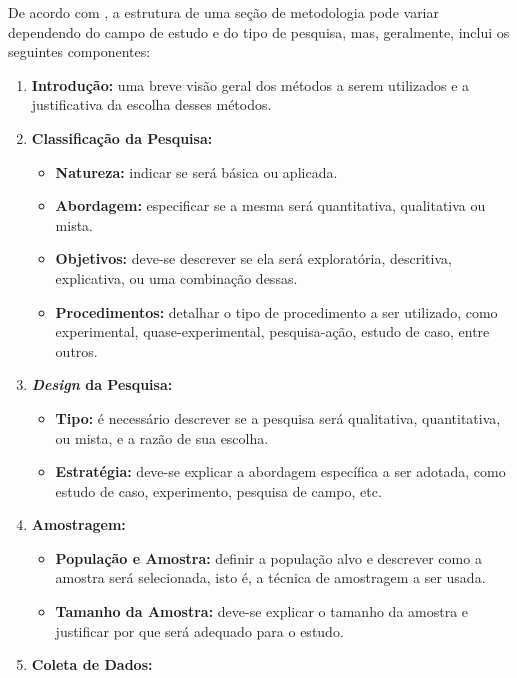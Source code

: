 De acordo com , a estrutura de uma seção de metodologia pode variar dependendo do campo de estudo e do tipo de pesquisa, mas, geralmente, inclui os seguintes componentes:
\begin{enumerate}[label=\roman*., nosep, leftmargin=2.3cm]
    \item \textbf{Introdução:} uma breve visão geral dos métodos a serem utilizados e a justificativa da escolha desses métodos.
    \item \textbf{Classificação da Pesquisa:}
        \begin{itemize}[nosep]
            \item \textbf{Natureza:} indicar se será básica ou aplicada.
            \item \textbf{Abordagem:} especificar se a mesma será quantitativa, qualitativa ou mista.
            \item \textbf{Objetivos:} deve-se descrever se ela será exploratória, descritiva, explicativa, ou uma combinação dessas.
            \item \textbf{Procedimentos:} detalhar o tipo de procedimento a ser utilizado, como experimental, quase-experimental, pesquisa-ação, estudo de caso, entre outros.
        \end{itemize}
    \item \textbf{\textit{Design} da Pesquisa:}
        \begin{itemize}[nosep]
            \item \textbf{Tipo:} é necessário descrever se a pesquisa será qualitativa, quantitativa, ou mista, e a razão de sua escolha.
            \item \textbf{Estratégia:} deve-se explicar a abordagem específica a ser adotada, como estudo de caso, experimento, pesquisa de campo, etc.
        \end{itemize}
   \item \textbf{Amostragem:}
        \begin{itemize}[nosep]
            \item \textbf{População e Amostra:} definir a população alvo e descrever como a amostra será selecionada, isto é, a técnica de amostragem a ser usada.
            \item \textbf{Tamanho da Amostra:} deve-se explicar o tamanho da amostra e justificar por que será adequado para o estudo.
        \end{itemize}
   \item \textbf{Coleta de Dados:}
        \begin{itemize}[nosep]

\end{itemize}
\end{enumerate}

